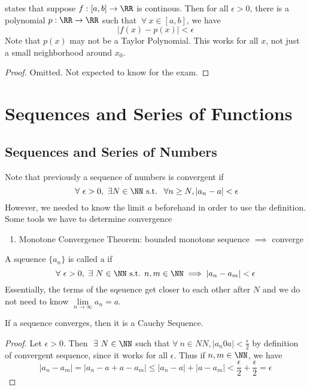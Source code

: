 \documentclass[12pt]{scrartcl}
\begin{document}
\begin{theorem}
   states that suppose $f: [a,b] \to \RR$ is continous. Then for all $\epsilon > 0$, 
  there is a polynomial $p: \RR \to \RR$ such that $\ \forall \ x \in [a,b]$, we have 
  \[|f(x) - p(x)| < \epsilon\]
  Note that $p(x)$ may not be a Taylor Polynomial. This works for all $x$, 
  not just a small neighborhood around $x_0$. 
  \begin{proof}
    Omitted. Not expected to know for the exam.
  \end{proof}
\end{theorem}

\section{Sequences and Series of Functions}

\subsection{Sequences and Series of Numbers}

\begin{note}
  Note that previously a sequence of numbers is convergent if 
  \[\ \forall \ \epsilon > 0, \ \exists N \in \NN \text{ s.t. } \ \forall n \geq N, |a_n - a| < \epsilon\]
  However, we needed to know the limit $a$ beforehand in order to use the definition.
  Some tools we have to determine convergence 
  \begin{enumerate}
    \item Monotone Convergence Theorem: bounded monotone sequence $\implies$ converge
  \end{enumerate}
\end{note}

\begin{definition}
  A sqeuence $\{a_n\}$ is called a  if 
  \[\forall \ \epsilon > 0, \ \exists \ N \in \NN \text{ s.t. } n, m \in \NN \implies |a_n - a_m| < \epsilon\]
  Essentially, the terms of the sqeuence get closer to each other after $N$ and we do not need to know $\underset{n\to\infty}{\lim}a_n = a$.
\end{definition}

\begin{theorem}
  If a sequence converges, then it is a Cauchy Sequence. 

  \begin{proof}
    Let $\epsilon > 0$. Then $\ \exists \ N \in \NN$ such that $\forall \ n \in NN, |a_n 0 a| < \frac{\epsilon}{2}$
    by definition of convergent sequence, since it works for all $\epsilon$. Thus if $n, m \in \NN$, we have 
    \[|a_n - a_m| = |a_n - a + a - a_m| \leq |a_n - a| + |a - a_m| < \frac{\epsilon}{2} + \frac{\epsilon}{2} = \epsilon\]
  \end{proof}
\end{theorem}
\end{document}

